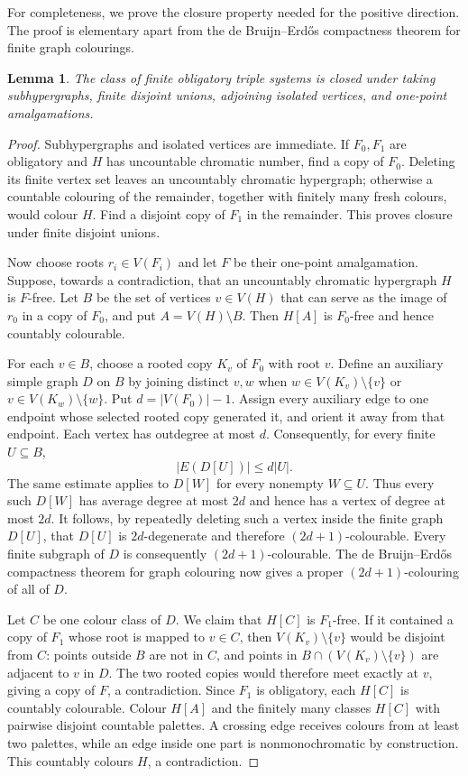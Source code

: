 \documentclass[11pt]{amsart}
\newtheorem{lemma}[lemma]{Lemma}
\theoremstyle{definition}
\theoremstyle{remark}
\numberwithin{equation}{section}
\begin{document}
For completeness, we prove the closure property needed for the positive
direction.  The proof is elementary apart from the de Bruijn--Erd\H{o}s
compactness theorem for finite graph colourings.

\begin{lemma}
\label{lem:obligatory-closure}
The class of finite obligatory triple systems is closed under taking
subhypergraphs, finite disjoint unions, adjoining isolated vertices, and
one-point amalgamations.
\end{lemma}

\begin{proof}
Subhypergraphs and isolated vertices are immediate.  If $F_0,F_1$ are
obligatory and $H$ has uncountable chromatic number, find a copy of
$F_0$.  Deleting its finite vertex set leaves an uncountably chromatic
hypergraph; otherwise a countable colouring of the remainder, together
with finitely many fresh colours, would colour $H$.  Find a disjoint copy
of $F_1$ in the remainder.  This proves closure under finite disjoint
unions.

Now choose roots $r_i\in V(F_i)$ and let $F$ be their one-point
amalgamation.  Suppose, towards a contradiction, that an uncountably
chromatic hypergraph $H$ is $F$-free.  Let $B$ be the set of vertices
$v\in V(H)$ that can serve as the image of $r_0$ in a copy of $F_0$, and
put $A=V(H)\setminus B$.  Then $H[A]$ is $F_0$-free and hence countably
colourable.

For each $v\in B$, choose a rooted copy $K_v$ of $F_0$ with root $v$.
Define an auxiliary simple graph $D$ on $B$ by joining distinct $v,w$
when $w\in V(K_v)\setminus\{v\}$ or
$v\in V(K_w)\setminus\{w\}$.  Put $d=|V(F_0)|-1$.  Assign every
auxiliary edge to one endpoint whose selected rooted copy generated it,
and orient it away from that endpoint.  Each vertex has outdegree at
most $d$.  Consequently, for every finite $U\subseteq B$,
\[
  |E(D[U])|\le d|U|.
\]
The same estimate applies to $D[W]$ for every nonempty $W\subseteq U$.
Thus every such $D[W]$ has average degree at most $2d$ and hence has a
vertex of degree at most $2d$.  It follows, by repeatedly deleting such
a vertex inside the finite graph $D[U]$, that $D[U]$ is
$2d$-degenerate and therefore $(2d+1)$-colourable.  Every finite subgraph
of $D$ is consequently $(2d+1)$-colourable.  The de Bruijn--Erd\H{o}s
compactness theorem for graph colouring \cite{deBruijnErdos} now gives a
proper $(2d+1)$-colouring of all of $D$.

Let $C$ be one colour class of $D$.  We claim that $H[C]$ is $F_1$-free.
If it contained a copy of $F_1$ whose root is mapped to $v\in C$, then
$V(K_v)\setminus\{v\}$ would be disjoint from $C$: points outside $B$
are not in $C$, and points in
$B\cap(V(K_v)\setminus\{v\})$ are adjacent to $v$ in $D$.  The two
rooted copies would therefore meet exactly at $v$, giving a copy of $F$,
a contradiction.  Since $F_1$ is obligatory, each $H[C]$ is countably
colourable.  Colour $H[A]$ and the finitely many classes $H[C]$ with
pairwise disjoint countable palettes.  A crossing edge receives colours
from at least two palettes, while an edge inside one part is
nonmonochromatic by construction.  This countably colours $H$, a
contradiction.
\end{proof}
\end{document}
